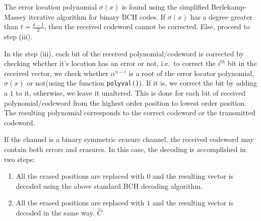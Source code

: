 \documentclass[a4paper]{article}
\begin{document}
The error location polynomial $\sigma(x)$ is found using the simplified Berlekamp-Massey iterative algorithm for binary BCH codes. If $\sigma(x)$ has a degree greater than $t = \frac{\delta - 1}{2}$, then the received codeword cannot be corrected. Else, proceed to step (iii).

In the step (iii), each bit of the received polynomial/codeword is corrected by checking whether it's location has an error or not, i.e.\ to correct the $i^{th}$ bit in the received vector, we check whether $\alpha^{n-i}$ is a root of the error locator polynomial, $\sigma(x)$ or not(using the function \texttt{polyval()}). If it is, we correct the bit by adding a $1$ to it, otherwise, we leave it unaltered. This is done for each bit of received polynomial/codeword from the highest order position to lowest order position. The resulting polynomial corresponds to the correct codeword or the transmitted codeword.

If the channel is a binary symmetric erasure channel, the received codeword may contain both errors and erasures. In this case, the decoding is accomplished in two steps: 
\renewcommand{\labelenumi}{(\roman{enumi})}
\begin{enumerate}
	\item All the erased positions are replaced with $0$ and the  resulting vector is decoded using the above standard BCH decoding algorithm.
	\item All the erased positions are replaced with $1$ and the  resulting vector is decoded in the same way. $\hat{C}$
\end{enumerate}
\end{document}
